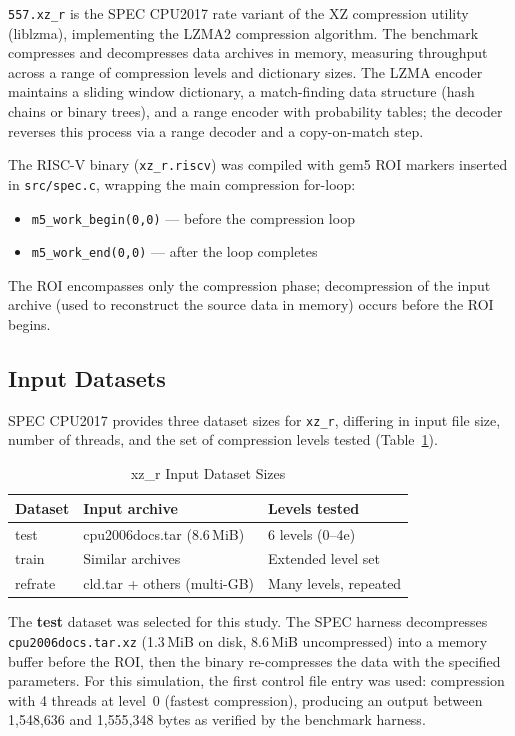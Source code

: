 \documentclass[conference]{IEEEtran}
\begin{document}
\texttt{557.xz\_r} is the SPEC CPU2017 rate variant of the XZ
compression utility (liblzma), implementing the LZMA2 compression
algorithm. The benchmark compresses and decompresses data archives
in memory, measuring throughput across a range of compression levels
and dictionary sizes. The LZMA encoder maintains a sliding window
dictionary, a match-finding data structure (hash chains or binary
trees), and a range encoder with probability tables; the decoder
reverses this process via a range decoder and a copy-on-match step.

The RISC-V binary (\texttt{xz\_r.riscv}) was compiled with gem5
ROI markers inserted in \texttt{src/spec.c}, wrapping the main
compression for-loop:

\begin{itemize}
    \item \texttt{m5\_work\_begin(0,0)} --- before the compression loop
    \item \texttt{m5\_work\_end(0,0)}   --- after the loop completes
\end{itemize}

The ROI encompasses only the compression phase; decompression of the
input archive (used to reconstruct the source data in memory) occurs
before the ROI begins.

\subsection{Input Datasets}

SPEC CPU2017 provides three dataset sizes for \texttt{xz\_r},
differing in input file size, number of threads, and the set of
compression levels tested (Table~\ref{tab:inputs}).

\begin{table}[H]
\centering
\caption{xz\_r Input Dataset Sizes}
\label{tab:inputs}
\begin{tabular}{lll}
\toprule
\textbf{Dataset} & \textbf{Input archive} & \textbf{Levels tested} \\
\midrule
test    & cpu2006docs.tar (8.6\,MiB)  & 6 levels (0--4e) \\
train   & Similar archives            & Extended level set \\
refrate & cld.tar + others (multi-GB) & Many levels, repeated \\
\bottomrule
\end{tabular}
\end{table}

The \textbf{test} dataset was selected for this study. The SPEC harness
decompresses \texttt{cpu2006docs.tar.xz} (1.3\,MiB on disk, 8.6\,MiB
uncompressed) into a memory buffer before the ROI, then the binary
re-compresses the data with the specified parameters. For this
simulation, the first control file entry was used: compression with
4 threads at level~0 (fastest compression), producing an output
between 1{,}548{,}636 and 1{,}555{,}348 bytes as verified by the
benchmark harness.
\end{document}
